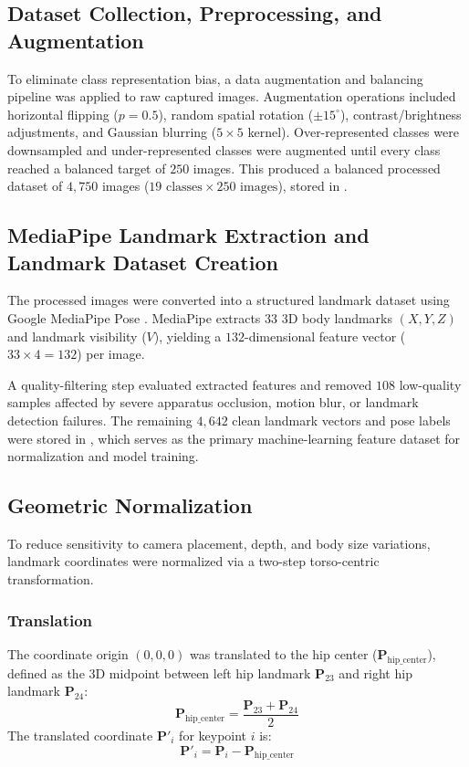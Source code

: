 \documentclass{ieeeaccess}
\begin{document}
\subsection{Dataset Collection, Preprocessing, and Augmentation}
To eliminate class representation bias, a data augmentation and balancing pipeline was applied to raw captured images. Augmentation operations included horizontal flipping ($p=0.5$), random spatial rotation ($\pm 15^{\circ}$), contrast/brightness adjustments, and Gaussian blurring ($5 \times 5$ kernel). Over-represented classes were downsampled and under-represented classes were augmented until every class reached a balanced target of $250$ images. This produced a balanced processed dataset of $4,750$ images ($19 \text{ classes} \times 250 \text{ images}$), stored in .

\subsection{MediaPipe Landmark Extraction and Landmark Dataset Creation}
The processed images were converted into a structured landmark dataset using Google MediaPipe Pose \cite{b14}. MediaPipe extracts $33$ 3D body landmarks $(X, Y, Z)$ and landmark visibility ($V$), yielding a $132$-dimensional feature vector ($33 \times 4 = 132$) per image.

A quality-filtering step evaluated extracted features and removed $108$ low-quality samples affected by severe apparatus occlusion, motion blur, or landmark detection failures. The remaining $4,642$ clean landmark vectors and pose labels were stored in , which serves as the primary machine-learning feature dataset for normalization and model training.

\subsection{Geometric Normalization}
To reduce sensitivity to camera placement, depth, and body size variations, landmark coordinates were normalized via a two-step torso-centric transformation.

\subsubsection{Translation}
The coordinate origin $(0,0,0)$ was translated to the hip center ($\mathbf{P}_{\mathrm{hip\_center}}$), defined as the 3D midpoint between left hip landmark $\mathbf{P}_{23}$ and right hip landmark $\mathbf{P}_{24}$:
\begin{equation}
\mathbf{P}_{\mathrm{hip\_center}} = \frac{\mathbf{P}_{23} + \mathbf{P}_{24}}{2}
\label{eq:hip_center}
\end{equation}
The translated coordinate $\mathbf{P}'_i$ for keypoint $i$ is:
\begin{equation}
\mathbf{P}'_i = \mathbf{P}_i - \mathbf{P}_{\mathrm{hip\_center}}
\label{eq:translation}
\end{equation}
\end{document}
